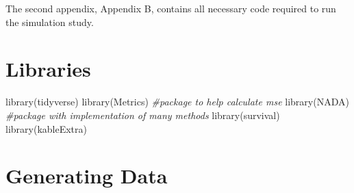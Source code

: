\documentclass[12pt, twoside]{amherstthesis}
\newenvironment{Shaded}{\begin{snugshade}}{\end{snugshade}}
\newcommand{\CommentTok}[1]{\textcolor[rgb]{0.56,0.35,0.01}{\textit{#1}}}
\newcommand{\FunctionTok}[1]{\textcolor[rgb]{0.00,0.00,0.00}{#1}}
\newcommand{\NormalTok}[1]{#1}
\begin{document}
The second appendix, Appendix B, contains all necessary code required to run the simulation study.

\hypertarget{libraries}{%
\section{Libraries}\label{libraries}}
\begin{Shaded}
\begin{Highlighting}[]
\FunctionTok{library}\NormalTok{(tidyverse)}
\FunctionTok{library}\NormalTok{(Metrics) }\CommentTok{\#package to help calculate mse}
\FunctionTok{library}\NormalTok{(NADA) }\CommentTok{\#package with implementation of many methods}
\FunctionTok{library}\NormalTok{(survival)}
\FunctionTok{library}\NormalTok{(kableExtra)}
\end{Highlighting}
\end{Shaded}
\hypertarget{generating-data}{%
\section{Generating Data}\label{generating-data}}
\end{document}
